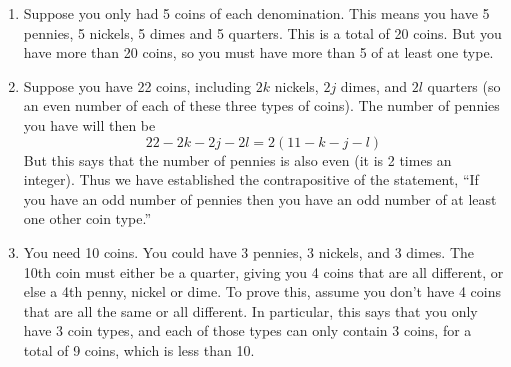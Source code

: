 \documentclass[10pt,]{book}
\theoremstyle{plain}
\theoremstyle{definition}
\theoremstyle{definition}
\theoremstyle{definition}
\numberwithin{equation}{chapter}
\begin{document}
\begin{enumerate}[label=(\alph*)]
\item\hypertarget{li-1178}{}
                Suppose you only had 5 coins of each denomination. This means you have 5 pennies, 5 nickels, 5 dimes and 5 quarters. This is a total of 20 coins. But you have more than 20 coins, so you must have more than 5 of at least one type.
\item\hypertarget{li-1179}{}
                Suppose you have 22 coins, including \(2k\) nickels, \(2j\) dimes, and \(2l\) quarters (so an even number of each of these three types of coins). The number of pennies you have will then be
                \begin{equation*}
                  22 - 2k - 2j - 2l = 2(11-k-j-l)
                \end{equation*}
                But this says that the number of pennies is also even (it is 2 times an integer). Thus we have established the contrapositive of the statement, ``If you have an odd number of pennies then you have an odd number of at least one other coin type.''
\item\hypertarget{li-1180}{}
                You need 10 coins. You could have 3 pennies, 3 nickels, and 3 dimes. The 10th coin must either be a quarter, giving you 4 coins that are all different, or else a 4th penny, nickel or dime. To prove this, assume you don't have 4 coins that are all the same or all different. In particular, this says that you only have 3 coin types, and each of those types can only contain 3 coins, for a total of 9 coins, which is less than 10.
\end{enumerate}
\par\smallskip
\end{document}
